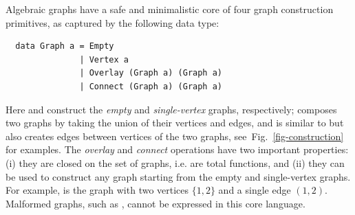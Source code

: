 Algebraic graphs have a safe and minimalistic core of four graph construction primitives,
as captured by the following data type:

\vspace{-0.59mm}
\begin{verbatim}
  data Graph a = Empty
               | Vertex a
               | Overlay (Graph a) (Graph a)
               | Connect (Graph a) (Graph a)
\end{verbatim}
\vspace{-0.59mm}

\noindent
Here  and  construct the \emph{empty} and \emph{single-vertex} graphs,
respectively;  composes two graphs by taking the union of their vertices and
edges, and  is similar to  but also creates edges between vertices
of the two graphs, see~Fig.~\ref{fig-construction} for examples. The \emph{overlay} and
\emph{connect} operations have two important properties:
(i) they are closed on the set of graphs, i.e. are total functions, and (ii) they can be used
to construct any graph starting from the empty and single-vertex graphs.
For example,  is the graph with two vertices $\{1,2\}$
and a single edge $(1,2)$. Malformed graphs, such as , cannot be
expressed in this core language.

